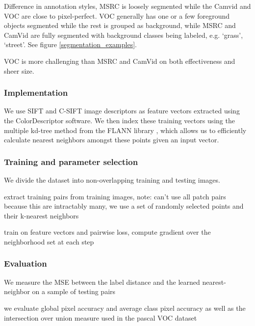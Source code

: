 \documentclass[a4paper,titlepage]{article}
\begin{document}
Difference in annotation styles, MSRC is loosely segmented while the Camvid and VOC are close to pixel-perfect. VOC generally has one or a few foreground objects segmented while the rest is grouped as background, while MSRC and CamVid are fully segmented with background classes being labeled, e.g. `grass', `street'. See figure \ref{segmentation_examples}.

VOC is more challenging than MSRC and CamVid on both effectiveness and sheer size.


\subsubsection{Implementation}

We use SIFT and C-SIFT image descriptors as feature vectors extracted using the ColorDescriptor software. \cite{sande2011empowering} We then index these training vectors using the multiple kd-tree method from the FLANN library \cite{muja2009fast}, which allows us to efficiently calculate nearest neighbors amongst these points given an input vector.


\subsubsection{Training and parameter selection}

We divide the dataset into non-overlapping training and testing images. 


extract training pairs from training images, note: can't use all patch pairs because this are intractably many, we use a set of randomly selected points and their k-nearest neighbors

train on feature vectors and pairwise loss, compute gradient over the neighborhood set at each step







\subsubsection{Evaluation}



We measure the \ac{MSE} between the label distance and the learned nearest-neighbor on a sample of testing pairs


we evaluate global pixel accuracy and average class pixel accuracy as well as the intersection over union measure used in the pascal VOC dataset
\end{document}
